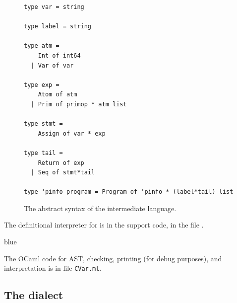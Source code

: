 \documentclass[11pt]{book}
\newenvironment{ocamlx}{
  \begin{color}{blue}
}
{
  \end{color}
}
\begin{document}
\begin{figure}[tbp]
\begin{lstlisting}[style=ocaml,frame=single]
type var = string

type label = string

type atm = 
    Int of int64
  | Var of var

type exp =
    Atom of atm
  | Prim of primop * atm list

type stmt =
    Assign of var * exp

type tail =
    Return of exp
  | Seq of stmt*tail

type 'pinfo program = Program of 'pinfo * (label*tail) list
\end{lstlisting}
\caption{The abstract syntax of the \LangCVar{} intermediate language.}
\label{fig:c0-syntax}
\end{figure}

The definitional interpreter for \LangCVar{} is in the support code,
in the file .
\begin{ocamlx}
  The OCaml code for \LangCVar{} AST, checking, printing (for debug purposes),
  and interpretation is in file \texttt{CVar.ml}. 
\end{ocamlx}

\subsection{The \LangXVar{} dialect}
\end{document}

